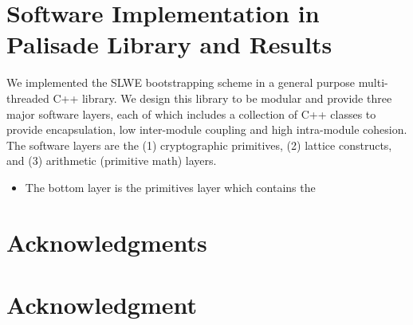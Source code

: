 \documentclass[10pt,journal,compsoc]{IEEEtran}
\theoremstyle{definition}
\begin{document}
\section{Software Implementation in Palisade Library and Results}
We implemented the SLWE bootstrapping scheme in a general purpose multi-threaded C++ library. We design this library to be modular and provide three major software layers, each of which includes a collection of C++ classes to provide encapsulation, low inter-module coupling and high intra-module cohesion. The software layers are the (1) cryptographic primitives,
(2) lattice constructs, and (3) arithmetic (primitive math) layers.

\begin{itemize}
\item The bottom layer is the primitives layer which contains the 
\end{itemize}
\appendices


\ifCLASSOPTIONcompsoc
  \section*{Acknowledgments}
\else
  \section*{Acknowledgment}
\fi




\ifCLASSOPTIONcaptionsoff
  \newpage
\fi





%
%
%
\end{document}

